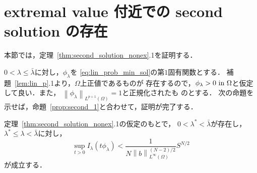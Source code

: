  \section{extremal value 付近での second solution の存在} \label{sec:exist}
 
 本節では，定理~\ref{thm:second_solution_nonex}.1を証明する．
 
 $0 < \lambda \leq \bar{\lambda}$に対し，$\phi_\lambda$を
 \eqref{eq:lin_prob_min_sol}の第$1$固有関数とする．
 補題~\ref{lem:lin_p}.1より，$\Omega$上正値であるものが
 存在するので，$\phi_\lambda > 0 ~\text{in}~ \Omega$と仮定して良い．また，
 $\left\| \phi_\lambda \right\|_{L^{p+1}(\Omega)} = 1$と正規化されたも
 のとする．
 次の命題を示せば，命題~\ref{prop:second_1}と合わせて，証明が完了する．
 
\begin{prop} \label{prop:exist}
 定理~\ref{thm:second_solution_nonex}.1の仮定のもとで，
 $0 < \lambda^* < \bar{\lambda}$が存在し，
 $\lambda^* \leq \lambda < \bar{\lambda}$に対し，
 \begin{equation}
  \sup_{t > 0} I_\lambda(t \phi_\lambda) < \frac{1}{N \left\| b
                                                                                            \right\|_{L^\infty(\Omega)}^{(N-2)/2}}
  S^{N/2} \label{eq:exist_S}
 \end{equation}
 が成立する．
\end{prop}

